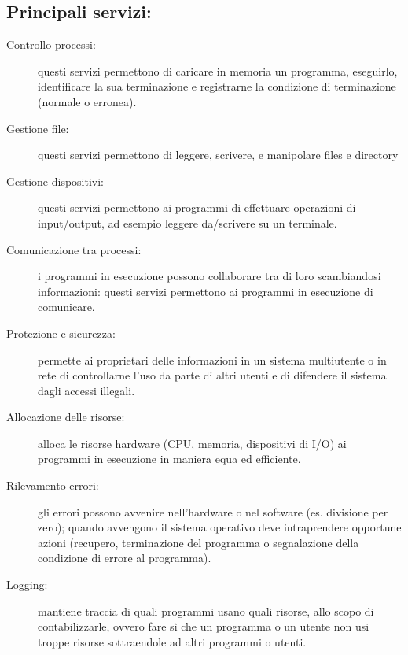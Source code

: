 \begin{description}
\subsection{Principali servizi:}
\begin{description}
    \item[Controllo processi:] questi servizi permettono di caricare in memoria un programma, eseguirlo, identificare la sua terminazione e registrarne la condizione di terminazione (normale o erronea).
    \item[Gestione file:] questi servizi permettono di leggere, scrivere, e manipolare files e directory
    \item[Gestione dispositivi:] questi servizi permettono ai programmi di effettuare operazioni di input/output, ad esempio leggere da/scrivere su un terminale.
    \item[Comunicazione tra processi:] i programmi in esecuzione possono collaborare tra di loro scambiandosi informazioni: questi servizi permettono ai programmi in esecuzione di comunicare.
    \item[Protezione e sicurezza:] permette ai proprietari delle informazioni in un sistema multiutente o in rete di controllarne l'uso da parte di altri utenti e di difendere il sistema dagli accessi illegali.
    \item[Allocazione delle risorse:] alloca le risorse hardware (CPU, memoria, dispositivi di I/O) ai programmi in esecuzione in maniera equa ed efficiente.
    \item[Rilevamento errori:] gli errori possono avvenire nell'hardware o nel software (es. divisione per zero); quando avvengono il sistema operativo deve intraprendere opportune azioni (recupero, terminazione del programma o segnalazione della condizione di errore al programma).
    \item[Logging:] mantiene traccia di quali programmi usano quali risorse, allo scopo di contabilizzarle, ovvero fare sì che un programma o un utente non usi troppe risorse sottraendole ad altri programmi o utenti.
\end{description}


\end{description}
